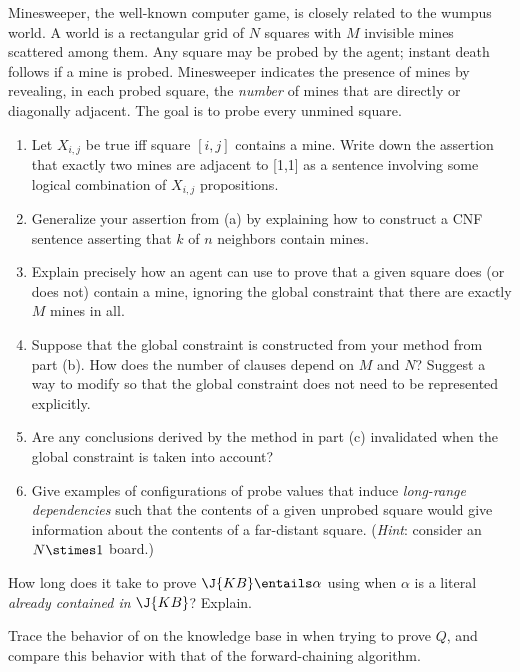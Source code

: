 \begin{exercise}
Minesweeper, the well-known computer game, is closely related to the
wumpus world. A  world is a rectangular grid
of \(N\) squares with \(M\) invisible mines scattered among them.
Any square may be probed by the agent; instant death follows if a mine
is probed. Minesweeper indicates the
presence of mines by revealing, in each probed square, the {\em
number} of mines that are directly or diagonally adjacent.
The goal is to  probe every unmined square.
\begin{enumerate}
\item Let \(X_{i,j}\) be true iff square \([i,j]\) contains a mine.
Write down the assertion that exactly two mines are adjacent to
[1,1] as a sentence involving some logical combination of \(X_{i,j}\) propositions.
\item Generalize your assertion from (a)
 by explaining how to construct a CNF sentence
asserting that \(k\) of \(n\) neighbors contain mines.
\item Explain precisely how an agent can use  to prove
that a given square does (or does not) contain a mine, ignoring the
global constraint that there are exactly \(M\) mines in all.
\item Suppose that the global constraint is constructed
from your method from part (b). How does the number of clauses
depend on \(M\) and \(N\)? Suggest a way to modify  so that
the global constraint does not need to be represented explicitly.
\item Are any conclusions derived by the method in part (c)
invalidated when the global constraint is taken into account?
\item Give examples of configurations of probe values that induce {\em
long-range dependencies} such that the contents of a
given unprobed square would give information about the contents of a
far-distant square. ({\em Hint}: consider an \(N\stimes 1\) board.)
\end{enumerate}
\end{exercise} 

\begin{exercise}
How long does it take to prove \(\J{KB}\entails\alpha\) using  when \(\alpha\) is a literal
{\em already contained in} \(\J{KB}\)? Explain.
\end{exercise} 

\begin{exercise}
Trace the behavior of  on the knowledge base
in  when trying to prove \(Q\), and
compare this behavior with that of the forward-chaining algorithm.
\end{exercise} 


